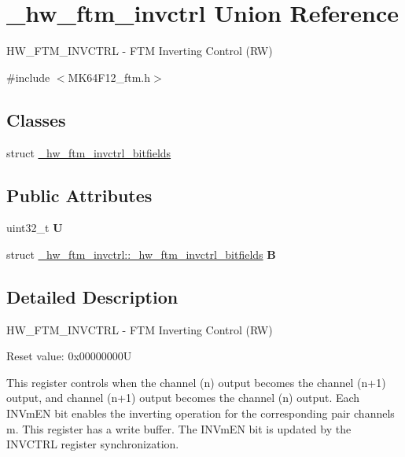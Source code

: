\hypertarget{union__hw__ftm__invctrl}{}\section{\+\_\+hw\+\_\+ftm\+\_\+invctrl Union Reference}
\label{union__hw__ftm__invctrl}


H\+W\+\_\+\+F\+T\+M\+\_\+\+I\+N\+V\+C\+T\+RL -\/ F\+TM Inverting Control (RW)  




{\ttfamily \#include $<$M\+K64\+F12\+\_\+ftm.\+h$>$}

\subsection*{Classes}
\begin{DoxyCompactItemize}
\item 
struct \hyperlink{struct__hw__ftm__invctrl_1_1__hw__ftm__invctrl__bitfields}{\+\_\+hw\+\_\+ftm\+\_\+invctrl\+\_\+bitfields}
\end{DoxyCompactItemize}
\subsection*{Public Attributes}
\begin{DoxyCompactItemize}
\item 
uint32\+\_\+t {\bfseries U}\hypertarget{union__hw__ftm__invctrl_ae19557b1f0f3953c5ac959e6b7e960b6}{}\label{union__hw__ftm__invctrl_ae19557b1f0f3953c5ac959e6b7e960b6}

\item 
struct \hyperlink{struct__hw__ftm__invctrl_1_1__hw__ftm__invctrl__bitfields}{\+\_\+hw\+\_\+ftm\+\_\+invctrl\+::\+\_\+hw\+\_\+ftm\+\_\+invctrl\+\_\+bitfields} {\bfseries B}\hypertarget{union__hw__ftm__invctrl_a287b8c336401635f02af06dbb8c61a85}{}\label{union__hw__ftm__invctrl_a287b8c336401635f02af06dbb8c61a85}

\end{DoxyCompactItemize}


\subsection{Detailed Description}
H\+W\+\_\+\+F\+T\+M\+\_\+\+I\+N\+V\+C\+T\+RL -\/ F\+TM Inverting Control (RW) 

Reset value\+: 0x00000000U

This register controls when the channel (n) output becomes the channel (n+1) output, and channel (n+1) output becomes the channel (n) output. Each I\+N\+Vm\+EN bit enables the inverting operation for the corresponding pair channels m. This register has a write buffer. The I\+N\+Vm\+EN bit is updated by the I\+N\+V\+C\+T\+RL register synchronization. 


